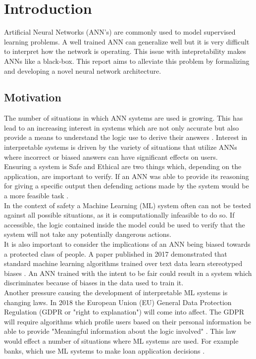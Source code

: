 \chapter{Introduction}\label{C:intro}

Artificial Neural Networks (ANN's) are commonly used to model supervised learning problems. A well trained ANN can generalize well but it is very difficult to interpret how the network is operating. This issue with intepretability makes ANNs like a black-box. This report aims to alleviate this problem by formalizing and developing a novel neural network architecture.

\section{Motivation}
The number of situations in which ANN systems are used is growing. This has lead to an increasing interest in systems which are not only accurate but also provide a means to understand the logic use to derive their answers \cite{doshi2017towards}. Interest in interpretable systems is driven by the variety of situations that utilize ANNs where incorrect or biased answers can have significant effects on users.\\

Ensuring a system is Safe and Ethical are two things which, depending on the application, are important to verify. If an ANN was able to provide its reasoning for giving a specific output then defending actions made by the system would be a more feasible task \cite{doshi2017towards}.\\

In the context of safety a Machine Learning (ML) system often can not be tested against all possible situations, as it is computationally infeasible to do so. If accessible, the logic contained inside the model could be used to verify that the system will not take any potentially dangerous actions.\\

It is also important to consider the implications of an ANN being biased towards a protected class of people. A paper published in 2017 demonstrated that standard machine learning algorithms trained over text data learn stereotyped biases \cite{caliskan2017semantics}. An ANN trained with the intent to be fair could result in a system which discriminates because of biases in the data used to train it.\\

Another pressure causing the development of interpretable ML systems is changing laws. In 2018 the European Union (EU) General Data Protection Regulation (GDPR or "right to explanation") will come into affect. The GDPR will require algorithms which profile users based on their personal information be able to provide "Meaningful information about the logic involved"  \cite{eu-dgpr}. This law would effect a number of situations where ML systems are used. For example banks, which use ML systems to make loan application decisions \cite{goodman2016european}.\\

